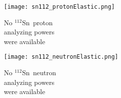 \documentclass[twocolumn,secnumarabic,amssymb, nobibnotes, aps, prl,
superscriptaddress, nobalancelastpage, floatfix]{revtex4}
\newcommand{\snTwelve}{\ensuremath{^{112}}S\lowercase{n}}
\begin{document}
{\begin{figure*}[!htb]
    \centering
    \begin{minipage}{0.4\linewidth}
        \centering
        \begin{minipage}[c]{0.5\linewidth}
            \centering
                \texttt{[image: sn112\_protonElastic.png]}
        \end{minipage}
        \begin{minipage}[c]{0.45\linewidth}
            \centering
            No \snTwelve\ proton \\
            analyzing powers \\
            were available
        \end{minipage}
        \label{DOM_sn112_proton_elastic}
    \end{minipage}\hspace{6pt}
    \begin{minipage}{0.4\linewidth}
        \centering
        \begin{minipage}[c]{0.5\linewidth}
            \centering
                \texttt{[image: sn112\_neutronElastic.png]}
        \end{minipage}
        \begin{minipage}[c]{0.45\linewidth}
            \centering
            No \snTwelve\ neutron \\
            analyzing powers \\
            were available
        \end{minipage}
        \label{DOM_sn112_neutron_elastic}
    \end{minipage}

    \vspace{10pt}


\end{figure*}}
\end{document}
